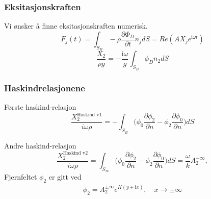 \documentclass{beamer}
\begin{document}
\begin{frame}
\frametitle{Eksitasjonskraften}
Vi ønsker å finne eksitasjonskraften numerisk. %
\begin{equation}
	F_j(t)  =  \int_{S_B} - \rho \frac{\partial  \Phi_D }{\partial t }   n_j dS = Re(AX_j e^{\mathrm{i} \omega t})
\end{equation}
\begin{equation}
\frac{X_2}{\rho g}  =  -  \frac{\mathrm{i} \omega}{g}\int_{S_B}   \phi_D n_2dS
\end{equation}
\end{frame}

\begin{frame}
\frametitle{Haskindrelasjonene}
Første haskind-relasjon
\begin{equation}
\frac{X_2^{\text{Haskind v1}}}{i \omega \rho} = -\int_{S_B}  \big( \phi_0 \frac{\partial \phi_2}{\partial n} -\phi_2 \frac{\partial \phi_0}{\partial n}  \big) dS 
\end{equation}

Andre haskind-relasjon
\begin{equation}
\frac{X_2^{\text{Haskind v2}}}{i \omega \rho} = \int_{S_\infty}  \big( \phi_0 \frac{\partial \phi_2}{\partial n} -\phi_2 \frac{\partial \phi_0}{\partial n}  \big) dS =  \frac{\omega}{k} A_2^{-\infty}, 
\end{equation}
Fjernfeltet $\phi_2$ er gitt ved
\begin{align}
\phi_2 = A_2^{\pm \infty}e^{K ({y} \mp \mathrm{i}  {x}) },  \quad x \rightarrow\pm \infty
\end{align}
\end{frame}
\end{document}
